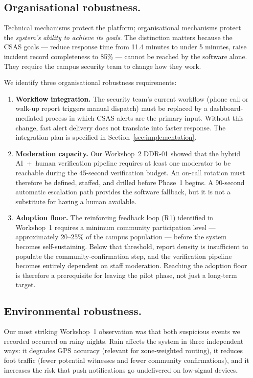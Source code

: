 \documentclass[12pt,a4paper]{article}
\begin{document}
\subsection{Organisational robustness.}
Technical mechanisms protect the platform; organisational mechanisms
protect the \emph{system's ability to achieve its goals}. The
distinction matters because the CSAS goals --- reduce response time
from 11.4 minutes to under 5 minutes, raise incident record
completeness to 85\% --- cannot be reached by the software alone.
They require the campus security team to change how they work.

We identify three organisational robustness requirements:

\begin{enumerate}
\item \textbf{Workflow integration.} The security team's current
  workflow (phone call or walk-up report triggers manual dispatch)
  must be replaced by a dashboard-mediated process in which CSAS
  alerts are the primary input. Without this change, fast alert
  delivery does not translate into faster response. The
  integration plan is specified in Section~\ref{sec:implementation}.

\item \textbf{Moderation capacity.} Our Workshop~2 DDR-01 showed that
  the hybrid AI~+~human verification pipeline requires at least one
  moderator to be reachable during the 45-second verification
  budget. An on-call rotation must therefore be defined, staffed,
  and drilled before Phase~1 begins. A 90-second automatic
  escalation path provides the software fallback, but it is not
  a substitute for having a human available.

\item \textbf{Adoption floor.} The reinforcing feedback loop (R1)
  identified in Workshop~1 requires a minimum community
  participation level --- approximately 20--25\% of the campus
  population --- before the system becomes self-sustaining. Below
  that threshold, report density is insufficient to populate the
  community-confirmation step, and the verification pipeline
  becomes entirely dependent on staff moderation. Reaching the
  adoption floor is therefore a prerequisite for leaving the
  pilot phase, not just a long-term target.
\end{enumerate}

\subsection{Environmental robustness.}
Our most striking Workshop~1 observation was that both suspicious
events we recorded occurred on rainy nights. Rain affects the system
in three independent ways: it degrades GPS accuracy (relevant for
zone-weighted routing), it reduces foot traffic (fewer potential
witnesses and fewer community confirmations), and it increases
the risk that push notifications go undelivered on low-signal
devices.
\end{document}

